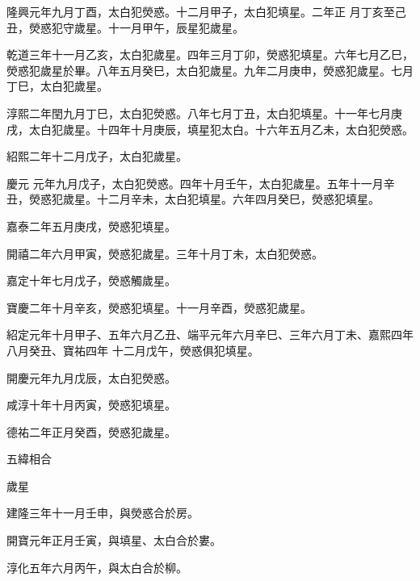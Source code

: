 \begin{pinyinscope}
 隆興元年九月丁酉，太白犯熒惑。十二月甲子，太白犯填星。二年正
 月丁亥至己丑，熒惑犯守歲星。十一月甲午，辰星犯歲星。



 乾道三年十一月乙亥，太白犯歲星。四年三月丁卯，熒惑犯填星。六年七月乙巳，熒惑犯歲星於畢。八年五月癸巳，太白犯歲星。九年二月庚申，熒惑犯歲星。七月丁巳，太白犯歲星。



 淳熙二年閏九月丁巳，太白犯熒惑。八年七月丁丑，太白犯填星。十一年七月庚戌，太白犯歲星。十四年十月庚辰，填星犯太白。十六年五月乙未，太白犯熒惑。



 紹熙二年十二月戊子，太白犯歲星。



 慶元
 元年九月戊子，太白犯熒惑。四年十月壬午，太白犯歲星。五年十一月辛丑，熒惑犯歲星。十二月辛未，太白犯填星。六年四月癸巳，熒惑犯填星。



 嘉泰二年五月庚戌，熒惑犯填星。



 開禧二年六月甲寅，熒惑犯歲星。三年十月丁未，太白犯熒惑。



 嘉定十年七月戊子，熒惑觸歲星。



 寶慶二年十月辛亥，熒惑犯填星。十一月辛酉，熒惑犯歲星。



 紹定元年十月甲子、五年六月乙丑、端平元年六月辛巳、三年六月丁未、嘉熙四年八月癸丑、寶祐四年
 十二月戊午，熒惑俱犯填星。



 開慶元年九月戊辰，太白犯熒惑。



 咸淳十年十月丙寅，熒惑犯填星。



 德祐二年正月癸酉，熒惑犯歲星。



 五緯相合



 歲星



 建隆三年十一月壬申，與熒惑合於房。



 開寶元年正月壬寅，與填星、太白合於婁。



 淳化五年六月丙午，與太白合於柳。




\end{pinyinscope}

